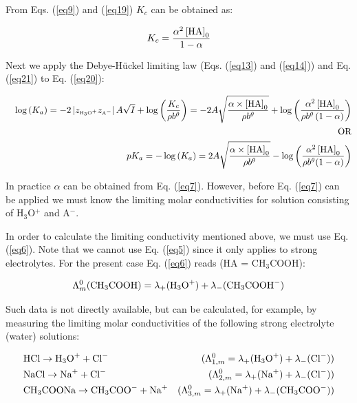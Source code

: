 \documentclass[byrevtex,amssymb,aps,pra,floatfix,letterpaper]{revtex4}
\begin{document}
\noindent
From Eqs. (\ref{eq9}) and (\ref{eq19}) $K_c$ can be obtained as:

\begin{equation}
K_c = \frac{\alpha^2\left[\textnormal{HA}\right]_0}{1 - \alpha}
\label{eq21}
\end{equation}

\noindent
Next we apply the Debye-H\"uckel limiting law (Eqs. (\ref{eq13}) and (\ref{eq14})) and Eq. (\ref{eq21}) to Eq. (\ref{eq20}):

\begin{eqnarray}
& & \log\left(K_a\right) = -2\left|z_{\textnormal{\tiny H}_3\textnormal{\tiny O}^+}z_{\textnormal{\tiny A}^-}\right|A\sqrt{I} + \log\left(\frac{K_c}{\rho b^\theta}\right)
= -2A\sqrt{\frac{\alpha\times\left[\textnormal{HA}\right]_0}{\rho b^\theta}} + \log\left(\frac{\alpha^2\left[\textnormal{HA}\right]_0}{\rho b^\theta\left(1 - \alpha\right)}\right)\\
\nonumber
& & \textnormal{OR}\\
& & pK_a = -\log\left(K_a\right) = 2A\sqrt{\frac{\alpha\times\left[\textnormal{HA}\right]_0}{\rho b^\theta}} - \log\left(\frac{\alpha^2\left[\textnormal{HA}\right]_0}{\rho b^\theta(1 - \alpha)}\right)
\nonumber
\label{eq22}
\end{eqnarray}

\noindent
In practice $\alpha$ can be obtained from Eq. (\ref{eq7}). However, before Eq. (\ref{eq7}) can be applied we must know the limiting molar conductivities for solution consisting of H$_3$O$^+$ and A$^-$.

In order to calculate the limiting conductivity mentioned above, we must use Eq. (\ref{eq6}). Note that we cannot use Eq. (\ref{eq5}) since it only applies to strong electrolytes. For the present case Eq. (\ref{eq6}) reads (HA = CH$_3$COOH):

\begin{equation}
\Lambda_m^0(\textnormal{CH}_3\textnormal{COOH}) = \lambda_+(\textnormal{H}_3\textnormal{O}^+) + \lambda_-(\textnormal{CH}_3\textnormal{COOH}^-)
\label{eq23}
\end{equation}

\noindent
Such data is not directly available, but can be calculated, for example, by measuring the limiting molar conductivities of the following strong electrolyte (water) solutions:

\begin{eqnarray}
& \textnormal{HCl} \rightarrow \textnormal{H}_3\textnormal{O}^+ + \textnormal{Cl}^- & (\Lambda_{1,m}^0 = \lambda_+(\textnormal{H}_3\textnormal{O}^+) + \lambda_-(\textnormal{Cl}^-))\\
\nonumber
& \textnormal{NaCl} \rightarrow \textnormal{Na}^+ + \textnormal{Cl}^- & (\Lambda_{2,m}^0 = \lambda_+(\textnormal{Na}^+) + \lambda_-(\textnormal{Cl}^-))\\
\nonumber
& \textnormal{CH}_3\textnormal{COONa} \rightarrow \textnormal{CH}_3\textnormal{COO}^- + \textnormal{Na}^+ & (\Lambda_{3,m}^0 = \lambda_+(\textnormal{Na}^+) + \lambda_-(\textnormal{CH}_3\textnormal{COO}^-))
\label{eq24}
\end{eqnarray}
\end{document}
